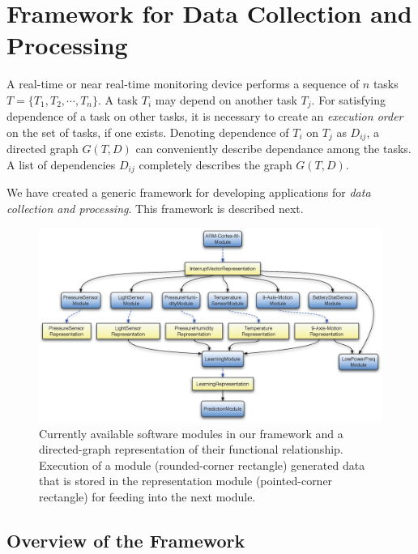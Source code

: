 \documentclass{IEEEtran}
\begin{document}
\section{Framework for Data Collection and Processing}
\label{sec:framework}

A real-time or near real-time monitoring device performs a sequence of $n$ tasks $T = \{ T_1, T_2,\cdots,T_n\}$. A task $T_i$ may depend on another task $T_j$.  For satisfying dependence of a task on other tasks, it is necessary to create an \emph{execution order} on the set of tasks, if one exists. Denoting dependence of $T_i$ on $T_j$ as $D_{ij}$, a directed graph $G(T,D)$ can conveniently describe dependance among the tasks. A list of dependencies $D_{ij}$ completely describes the graph $G(T,D)$.
\par
We have created a generic framework for developing applications for \emph{data collection and processing}. This framework is described next.

\begin{figure}[!t]
\centering
\includegraphics[width=\textwidth]{figures/graph_structure_def-crop3.eps}
\caption{Currently available software modules in our framework and a directed-graph representation of their functional relationship. Execution of a module (rounded-corner rectangle) generated data that is stored in the representation module (pointed-corner rectangle) for feeding into the next module.}
 \label{fig:framework}
\end{figure}

\subsection{Overview of the Framework}
\label{sec:OverviewOfTheFramework}
\end{document}
